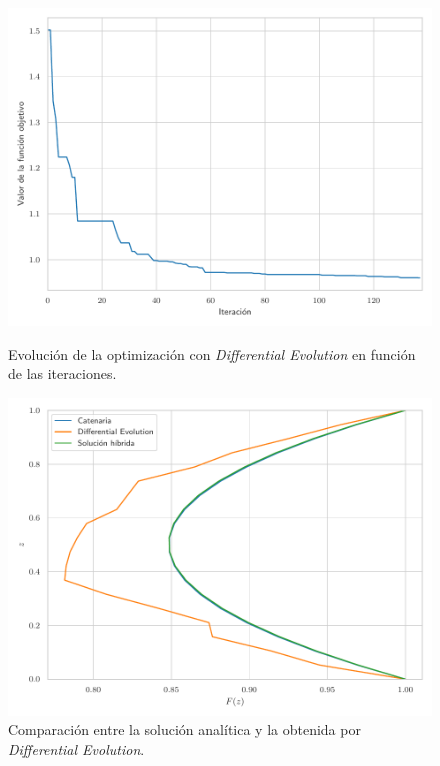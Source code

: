 \begin{figure}[h]
    \centering
    \begin{minipage}{0.45\textwidth}
        \centering
        \includegraphics[width = \linewidth]{Figures/01/evol_de.pdf}
        \caption{Evolución de la optimización con \textit{Differential Evolution} en función de las iteraciones.}
        \label{fig:evol_de}
    \end{minipage}
    \hfill
    \begin{minipage}{0.45\textwidth}
        \centering
        \includegraphics[width = \linewidth]{Figures/01/comp_de_cat.pdf}
        \caption{Comparación entre la solución analítica y la obtenida por \textit{Differential Evolution}.}
        \label{fig:comp_de_cat}
    \end{minipage}
\end{figure}

